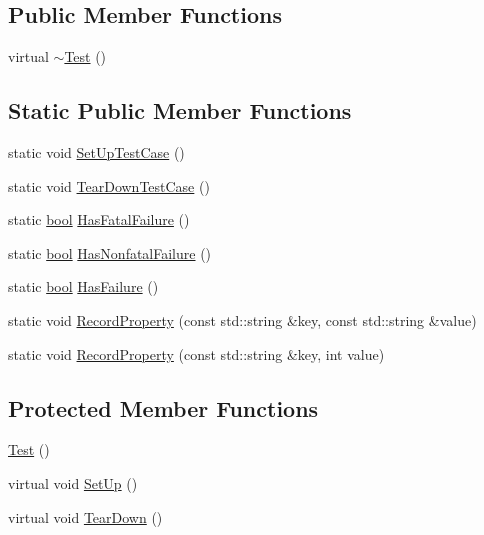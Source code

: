\subsection*{Public Member Functions}
\begin{DoxyCompactItemize}
\item 
virtual \hyperlink{classtesting_1_1Test_afc75dfea37533866035b0d97cd11483e}{$\sim$\+Test} ()
\end{DoxyCompactItemize}
\subsection*{Static Public Member Functions}
\begin{DoxyCompactItemize}
\item 
static void \hyperlink{classtesting_1_1Test_a5ccbac42fee8c5b00b0bfe89b6c49d79}{Set\+Up\+Test\+Case} ()
\item 
static void \hyperlink{classtesting_1_1Test_af374706cbaf0ffc460f4fd04e7c150f1}{Tear\+Down\+Test\+Case} ()
\item 
static \hyperlink{classbool}{bool} \hyperlink{classtesting_1_1Test_aa8d0725cfb519f82eaf4fd2d2f46d97d}{Has\+Fatal\+Failure} ()
\item 
static \hyperlink{classbool}{bool} \hyperlink{classtesting_1_1Test_a3b933cea62eff67a05e23aa07f38bf29}{Has\+Nonfatal\+Failure} ()
\item 
static \hyperlink{classbool}{bool} \hyperlink{classtesting_1_1Test_a7a00be7dd0a6bfdc8d47a1b784623613}{Has\+Failure} ()
\item 
static void \hyperlink{classtesting_1_1Test_a7b20a48c0bbc9dd1fe96715e4a5c0164}{Record\+Property} (const std\+::string \&key, const std\+::string \&value)
\item 
static void \hyperlink{classtesting_1_1Test_afb8d29af28e48dc65b2b743f1874ccfe}{Record\+Property} (const std\+::string \&key, int value)
\end{DoxyCompactItemize}
\subsection*{Protected Member Functions}
\begin{DoxyCompactItemize}
\item 
\hyperlink{classtesting_1_1Test_a68b7618abd1fc6d13382738b0d3b5c7c}{Test} ()
\item 
virtual void \hyperlink{classtesting_1_1Test_a57a4116f39f6636a80710ded7d42e889}{Set\+Up} ()
\item 
virtual void \hyperlink{classtesting_1_1Test_a2889fd829b6c712d98fb3896d28f64a3}{Tear\+Down} ()
\end{DoxyCompactItemize}
